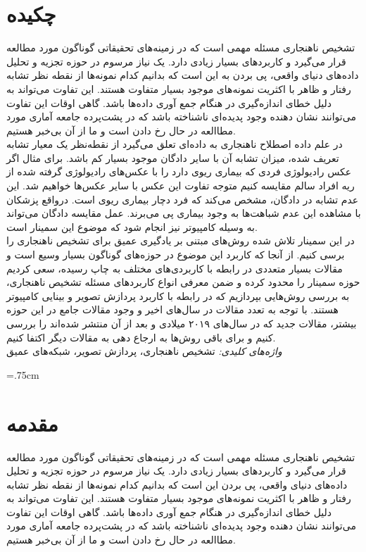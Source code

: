 \documentclass[12pt,a4paper]{report}
\newcommand*{\BeginNoToc}{%
  \addtocontents{toc}{%
    \edef\protect\SavedTocDepth{\protect\the\protect\value{tocdepth}}%
  }%
  \addtocontents{toc}{%
    \protect\setcounter{tocdepth}{-10}%
  }%
}
\newcommand*{\EndNoToc}{%
  \addtocontents{toc}{%
    \protect\setcounter{tocdepth}{\protect\SavedTocDepth}%
  }%
}
\theoremstyle{definition}
\theoremstyle{theorem}
\theoremstyle{definition}
\begin{document}
	
	\chapter*{چکیده}
	تشخیص ناهنجاری‌ مسئله مهمی است که در زمینه‌های تحقیقاتی گوناگون مورد مطالعه قرار می‌گیرد و کاربرد‌های بسیار زیادی دارد. یک نیاز مرسوم در حوزه تجزیه و تحلیل داده‌های دنیای واقعی، پی بردن به این است که بدانیم کدام نمونه‌ها از نقطه نظر تشابه رفتار و ظاهر با اکثریت نمونه‌های موجود بسیار متفاوت هستند. این تفاوت می‌تواند به دلیل خطای انداز‌ه‌گیری در هنگام جمع آوری داده‌ها باشد. گاهی اوقات این تفاوت می‌توانند نشان‌ دهنده وجود پدیده‌ای ناشناخته‌ باشد که در پشت‌پرده جامعه آماری مورد مطاالعه در حال رخ دادن است و ما از آن بی‌خبر هستیم. \\
در علم داده اصطلاح ناهنجاری به داده‌ای تعلق می‌گیرد از نقطه‌نظر یک معیار تشابه تعریف شده، میزان تشابه آن با سایر دادگان موجود بسیار کم باشد. برای مثال اگر عکس رادیولوژی فردی که بیماری ریوی دارد را با عکس‌های رادیولوژی گرفته شده از ریه افراد سالم مقایسه کنیم متوجه تفاوت این عکس با سایر عکس‌ها خواهیم شد. این عدم تشابه در دادگان، مشخص می‌کند  که فرد دچار بیماری ریوی است. درواقع پزشکان با مشاهده این عدم شباهت‌ها به وجود بیماری پی می‌برند. عمل مقایسه دادگان می‌تواند به وسیله کامپیوتر نیز انجام شود که موضوع این سمینار است.\\

در این سمینار تلاش شده روش‌های مبتنی بر یادگیری عمیق برای تشخیص ناهنجاری را برسی کنیم. از آنجا که کاربرد این موضوع در حوزه‌های گوناگون بسیار وسیع است و مقالات بسیار متعددی در رابطه با کاربردی‌های مختلف به چاپ رسیده، سعی کردیم حوزه سمینار را محدود کرده و ضمن معرفی انواع کاربرد‌های مسئله تشخیص ناهنجاری، به بررسی روش‌هایی بپردازیم که در رابطه با کاربرد پردازش تصویر و بینایی کامپیوتر هستند. با توجه به تعدد مقالات در سال‌های اخیر و وجود مقالات جامع در این حوزه بیشتر، مقالات جدید که در سال‌های  ۲۰۱۹ میلادی و بعد از آن منتشر شده‌اند را بررسی کنیم و برای باقی روش‌ها به ارجاع دهی به مقالات دیگر اکتفا کنیم.\\

	\textit{
واژه‌های کلیدی:
	}
	تشخیص ناهنجاری، پردازش تصویر، شبکه‌های عمیق

	\newpage
	\baselineskip=1cm
	\BeginNoToc
	\tableofcontents
	\listoffigures
	\listoftables
	\EndNoToc
	
	\newpage
	
	\baselineskip=.75cm
	\chapter{مقدمه}
	تشخیص ناهنجاری‌ مسئله مهمی است که در زمینه‌های تحقیقاتی گوناگون مورد مطالعه قرار می‌گیرد و کاربرد‌های بسیار زیادی دارد. یک نیاز مرسوم در حوزه تجزیه و تحلیل داده‌های دنیای واقعی، پی بردن این است که بدانیم کدام نمونه‌ها از نقطه نظر تشابه رفتار و ظاهر با اکثریت نمونه‌های موجود بسیار متفاوت هستند. این تفاوت می‌تواند به دلیل خطای انداز‌ه‌گیری در هنگام جمع آوری داده‌ها باشد. گاهی اوقات این تفاوت می‌توانند نشان‌ دهنده وجود پدیده‌ای ناشناخته‌ باشد که در پشت‌پرده جامعه آماری مورد مطاالعه در حال رخ دادن است و ما از آن بی‌خبر هستیم. 
	
\end{document}
